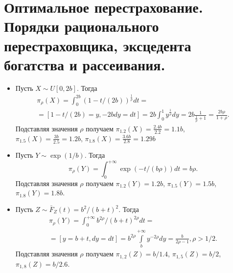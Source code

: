 \chapter{Оптимальное перестрахование. Порядки рационального перестраховщика, эксцедента богатства и рассеивания.}
\problem{}

\solution{}
\begin{itemize}
    \item Пусть $X \sim U[0,2b]$. Тогда
    \begin{multline}
        \pi_\rho(X) = \int_0^{2b} (1 - t/(2b) ) ^{\frac{1}{\rho}} dt =\\= [ 1 - t/(2b) = y,  -2bdy = dt] = 2b\int_0^1 y^{\frac1\rho} dy = 2b \frac{1}{\frac{1}{\rho} + 1} = \frac{2b\rho}{1 + \rho}.
    \end{multline}
    Подставляя значения $\rho$ получаем $\pi_{1.2}(X) = \frac{2.4 b}{2.2} = 1.1b$, $\pi_{1.5}(X) = \frac{3 b}{2.5} = 1.2b$, $\pi_{1.8}(X) = \frac{3.6 b}{2.8}= 1.29b$
    \item Пусть $Y \sim \exp(1/b)$. Тогда 
    \begin{equation}
        \pi_\rho(Y) = \int_0^{+\infty} \exp(-t/(b\rho)) dt = b\rho .
    \end{equation}
     Подставляя значения $\rho$ получаем  $\pi_{1.2}(Y) = 1.2b$, $\pi_{1.5}(Y) = 1.5b$,  $\pi_{1.8}(Y) = 1.8b$.

     \item Пусть $Z \sim \bar F_Z(t) = b^2 /(b+t)^2$. Тогда 
     \begin{multline}
         \pi_\rho(Y) = \int_0^{+\infty} b^{2\rho}/(b+ t)^{2\rho} dt =\\= [ y = b + t, dy = dt] = b^{2\rho}\int\limits_{b}^{+\infty} y^{-2\rho}dy = \frac{b}{2\rho - 1},  \rho>1/2.
     \end{multline}
     Подставляя  значения $\rho$ получаем $\pi_{1,2}(Z) = b/1.4$, $\pi_{1,5}(Z) = b/2$, $\pi_{1,8}(Z) = b/2.6$.
\end{itemize}